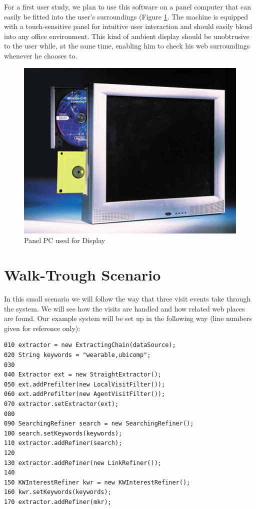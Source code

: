 \documentclass[a4paper]{danarticle}
\theoremstyle{remark}
\begin{document}
      For a first user study, we plan to use this software on a panel computer 
      that can easily be fitted into the user's surroundings (Figure \ref{ppc}. 
      The machine is 
      equipped with a touch-sensitive panel for intuitive user interaction and 
      should easily blend into any office environment. This kind of ambient 
      display should be unobtrusive to the user while, at the same time, enabling 
      him to check his web surroundings whenever he chooses to.
      \begin{figure}[ht]
        \centering
        \includegraphics[width=12cm]{ppc}
        \caption{Panel PC used for Display}
        \label{ppc}
      \end{figure}
  \section{Walk-Trough Scenario}
    In this small scenario we will follow the way that three visit events take    
    through the system. We will see how the visits are handled and how related 
    web places are found. Our example system will be set up in the following 
    way (line numbers given for reference only):
    \begin{verbatim}
010 extractor = new ExtractingChain(dataSource);
020 String keywords = "wearable,ubicomp";
030  
040 Extractor ext = new StraightExtractor();
050 ext.addPrefilter(new LocalVisitFilter());
060 ext.addPrefilter(new AgentVisitFilter());
070 extractor.setExtractor(ext);
080        
090 SearchingRefiner search = new SearchingRefiner();
100 search.setKeywords(keywords);
110 extractor.addRefiner(search);
120        
130 extractor.addRefiner(new LinkRefiner());
140                
150 KWInterestRefiner kwr = new KWInterestRefiner(); 
160 kwr.setKeywords(keywords); 
170 extractor.addRefiner(mkr); 
      \end{verbatim} 
      
\end{document}
